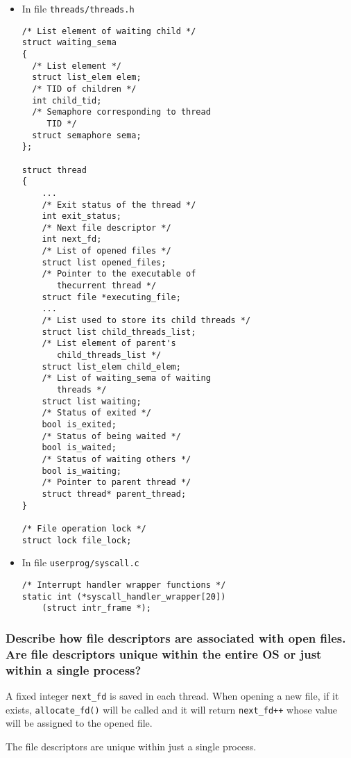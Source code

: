 \documentclass[sigconf, nonacm, balance=false, urlbreakonhyphens=true]{acmart}
\begin{document}
                \begin{itemize}
                    \item In file \texttt{threads/threads.h}
\begin{verbatim}
/* List element of waiting child */
struct waiting_sema
{
  /* List element */
  struct list_elem elem;
  /* TID of children */
  int child_tid;
  /* Semaphore corresponding to thread
     TID */
  struct semaphore sema;
};

struct thread
{
    ...
    /* Exit status of the thread */
    int exit_status;
    /* Next file descriptor */
    int next_fd;
    /* List of opened files */
    struct list opened_files;
    /* Pointer to the executable of 
       thecurrent thread */
    struct file *executing_file;        
    ...
    /* List used to store its child threads */
    struct list child_threads_list;
    /* List element of parent's 
       child_threads_list */
    struct list_elem child_elem;
    /* List of waiting_sema of waiting 
       threads */
    struct list waiting;
    /* Status of exited */
    bool is_exited;
    /* Status of being waited */
    bool is_waited;
    /* Status of waiting others */
    bool is_waiting;
    /* Pointer to parent thread */
    struct thread* parent_thread;
}

/* File operation lock */
struct lock file_lock;
\end{verbatim}
                    \item In file \texttt{userprog/syscall.c}
\begin{verbatim}
/* Interrupt handler wrapper functions */
static int (*syscall_handler_wrapper[20]) 
    (struct intr_frame *);
\end{verbatim}
                \end{itemize}

            \subsubsection{Describe how file descriptors are associated with open files.  Are file descriptors unique within the entire OS or just within a single process? }

            A fixed integer \texttt{next\_fd} is saved in each thread. When opening a new file, if it exists, \texttt{allocate\_fd()} will be called and it will return \texttt{next\_fd++} whose value will be assigned to the opened file. 

            The file descriptors are unique within just a single process. 
\end{document}
